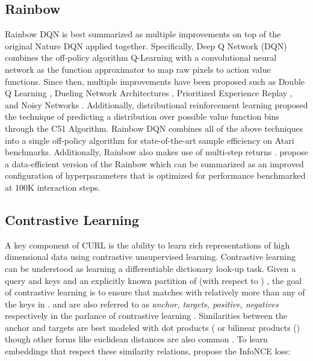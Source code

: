 \documentclass{article}
\begin{document}
\subsection{Rainbow}
Rainbow DQN \cite{hessel2017rainbow} is best summarized as multiple improvements on top of the original Nature DQN \cite{mnih2015human} applied together. Specifically, Deep Q Network (DQN) \cite{mnih2015human} combines the off-policy algorithm Q-Learning with a convolutional neural network as the function approximator to map raw pixels to action value functions. Since then, multiple improvements have been proposed such as Double Q Learning \cite{van2016deep}, Dueling Network Architectures \cite{wang2015dueling}, Prioritized Experience Replay \cite{schaul2015prioritized}, and Noisy Networks \cite{fortunato2017noisy}. Additionally, distributional reinforcement learning \cite{bellemare2017distributional} proposed the technique of predicting a distribution over possible value function bins through the C51 Algorithm. Rainbow DQN combines all of the above techniques into a single off-policy algorithm for state-of-the-art sample efficiency on Atari benchmarks. Additionally, Rainbow also makes use of multi-step returns \cite{sutton1998introduction}. \citet{van2019use} propose a data-efficient version of the Rainbow which can be summarized as an improved configuration of hyperparameters that is optimized for performance benchmarked at 100K interaction steps.


\subsection{Contrastive Learning}

A key component of CURL is the ability to learn rich representations of high dimensional data using contrastive unsupervised learning. Contrastive learning \cite{hadsell2006dimensionality, lecun2006tutorial, oord2018representation, wu2018unsupervised, he2019momentum} can be understood as learning a differentiable dictionary look-up task. Given a query  and keys  and an explicitly known partition of  (with respect to ) , the goal of contrastive learning is to ensure that  matches with  relatively more than any of the keys in .  and  are also referred to as {\it anchor, targets, positive, negatives} respectively in the parlance of contrastive learning \cite{oord2018representation, he2019momentum}. Similarities between the anchor and targets are best modeled with dot products ( \cite{wu2018unsupervised, he2019momentum} or bilinear products () \cite{oord2018representation, henaff2019data} though other forms like euclidean distances are also common \cite{schroff2015facenet, wang2015unsupervised}. To learn embeddings that respect these similarity relations, \citet{oord2018representation} propose the InfoNCE loss:
\end{document}
